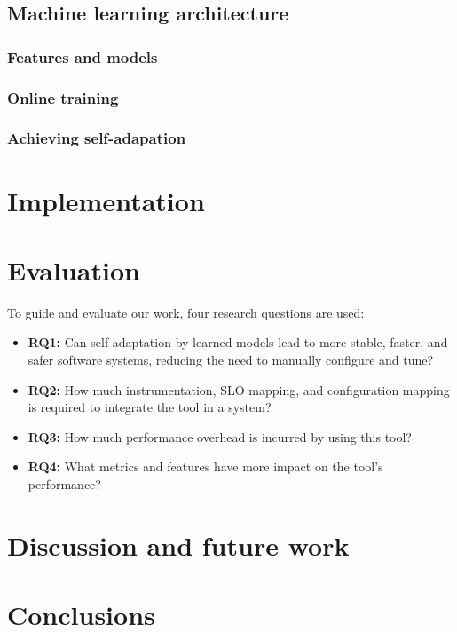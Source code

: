 \subsection{Machine learning architecture}

\subsubsection{Features and models}

\subsubsection{Online training}

\subsubsection{Achieving self-adapation}

\section{Implementation}

\section{Evaluation}

To guide and evaluate our work, four research questions are used:

\begin{itemize}
  \item \textbf{RQ1:} Can self-adaptation by learned models lead to more stable, faster, and safer software systems, reducing the need to manually configure and tune?
  \item \textbf{RQ2:} How much instrumentation, SLO mapping, and configuration mapping is required to integrate the tool in a system?
  \item \textbf{RQ3:} How much performance overhead is incurred by using this tool?
  \item \textbf{RQ4:} What metrics and features have more impact on the tool's performance?
\end{itemize}



\section{Discussion and future work}

\section{Conclusions}


\nocite{*}

\begin{acks}

\end{acks} 